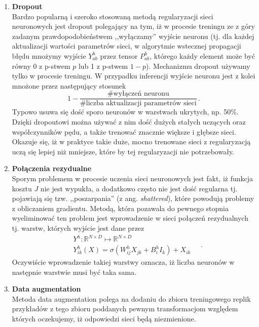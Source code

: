 \documentclass{myclass}
\begin{document}
\begin{enumerate}
    \item \textbf{Dropout}\\
    Bardzo popularną i szeroko stosowaną metodą regularyzacji sieci neuronowych jest dropout
    polegający na tym, iż w procesie treningu ze z góry zadanym prawdopodobieństwem ,,wyłączamy''
    wyjście neuronu (tj. dla każdej aktualizacji wartości parametrów sieci, w algorytmie wstecznej
    propagacji błędu mnożymy wyjście \(Y_{ab}^h\) przez tensor \(P_{ab}^h\), którego każdy element
    może być równy \(0\) z p-stwem \(p\) lub 1 z p-stwem \(1-p\)). Mechanizmu dropout używamy tylko
    w procesie treningu. W przypadku inferencji wyjście neuronu jest z kolei mnożone przez
    następujący stosunek
    \begin{equation*}
        1 - \frac{\# \text{wyłączeń neuronu}}{\# \text{liczba aktualizacji parametrów sieci}}\,.
    \end{equation*}
    Typowo usuwa się dość sporo neuronów w warstwach ukrytych, np. 50\%. Dzięki dropoutowi można
    używać z nim dość dużych stałych uczących oraz współczynników pędu, a także trenować znacznie
    większe i głębsze sieci. Okazuje się, iż w praktyce takie duże, mocno trenowane sieci z
    regularyzacją uczą się lepiej niż mniejsze, które by tej regularyzacji nie potrzebowały.
    
    \item \textbf{Połączenia rezydualne}\\
    Sporym problemem w procesie uczenia sieci neuronowych jest fakt, iż funkcja kosztu \(J\) nie
    jest wypukła, a dodatkowo często nie jest dość regularna tj. pojawiają się tzw. ,,poszarpania''
    (z ang. \textit{shattered}), które powodują problemy z obliczaniem gradientu. Metodą, która
    pozawala do pewnego stopnia wyeliminować ten problem jest wprowadzenie w sieci połączeń
    rezydualnych tj. warstw, których wyjście jest dane przez
    \begin{equation*}
        \begin{split}
            &Y^h: \mathbb{R}^{N\times D} \mapsto \mathbb{R}^{N\times D}\\
            &Y^h_{ik}(X) = \sigma\left(W_{ij}^h X_{jk} + B_{i}^h I_k\right) + X_{ik}
        \end{split}\quad.
    \end{equation*}
    Oczywiście wprowadzenie takiej warstwy oznacza, iż liczba neuronów w następnie warstwie musi być
    taka sama.

    \item \textbf{Data augmentation}\\
    Metoda data augmentation polega na dodaniu do zbioru treningowego replik przykładów z tego
    zbioru poddanych pewnym transformacjom względem których oczekujemy, iż odpowiedzi sieci będą
    niezmienione.

\end{enumerate}
\end{document}
